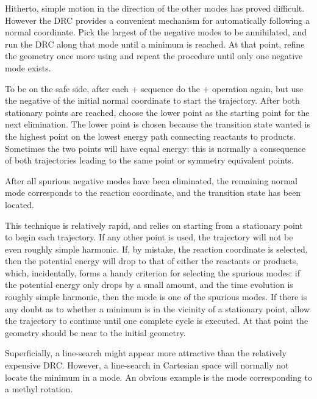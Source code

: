 Hitherto, simple motion in the direction of  the  other  modes  has 
proved  difficult.   However the DRC provides a convenient mechanism for
automatically following a normal coordinate.  Pick the  largest  of  the
negative  modes to be annihilated, and run the DRC along that mode until a
minimum is reached.  At that point,  refine  the  geometry  once  more using 
  and  repeat  the  procedure  until  only one negative mode exists.

To be on the safe  side,  after  each  +   sequence  do  the
+  operation  again,  but use the  negative of the initial
normal coordinate to start the trajectory.  After both  stationary  points  are
reached,  choose  the  lower  point  as  the starting point for the next
elimination.  The lower point is chosen  because  the  transition  state
wanted  is  the  highest  point  on  the  lowest  energy path connecting
reactants to products.  Sometimes the two points will have equal energy: this 
is normally a consequence of both trajectories leading to the same point or
symmetry equivalent points.

After  all  spurious  negative  modes  have  been  eliminated,  the remaining 
normal  mode  corresponds to the reaction coordinate, and the transition state
has been located.

This technique is relatively rapid, and relies on starting  from  a stationary 
point to begin each trajectory.  If any other point is used, the trajectory
will  not  be  even  roughly  simple  harmonic.   If,  by mistake,  the
reaction coordinate is selected, then the potential energy will  drop  to 
that  of  either  the  reactants  or  products,   which, incidentally,  forms a
handy criterion for selecting the spurious modes: if the potential energy only
drops by  a  small  amount,  and  the  time evolution  is  roughly  simple 
harmonic,  then  the  mode is one of the spurious modes.  If there is any doubt
as to whether a minimum is in the vicinity  of  a stationary point, allow the
trajectory to continue until one complete cycle is executed.  At that point
the  geometry  should  be near to the initial geometry.

Superficially, a line-search might appear more attractive than  the relatively 
expensive  DRC.   However,  a line-search in Cartesian space will normally not
locate the minimum in a mode.  An obvious  example  is the mode corresponding
to a methyl rotation.

